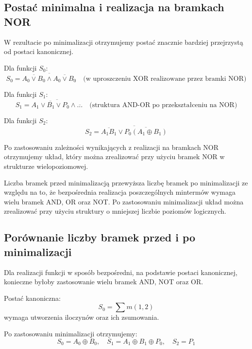 \documentclass[11pt]{article}
\begin{document}
\subsection{Postać minimalna i realizacja na bramkach NOR}

W rezultacie po minimalizacji otrzymujemy postać znacznie bardziej przejrzystą od postaci kanonicznej.

Dla funkcji \(S_0\):
\begin{equation}
S_0 = \overline{\overline{A_0 \lor B_0} \land \overline{A_0 \lor B_0}} \quad \text{(w uproszczeniu XOR realizowane przez bramki NOR)}
\end{equation}

Dla funkcji \(S_1\):
\begin{equation}
S_1 = \overline{\overline{A_1 \lor B_1 \lor P_0} \land \overline{\dots}} \quad \text{(struktura AND-OR po przekształceniu na NOR)}
\end{equation}

Dla funkcji \(S_2\):
\begin{equation}
S_2 = \overline{\overline{A_1 B_1} \lor \overline{P_0 (A_1 \oplus B_1)}}
\end{equation}

Po zastosowaniu zależności wynikających z realizacji na bramkach NOR otrzymujemy układ, który można zrealizować przy użyciu bramek NOR w strukturze wielopoziomowej.

Liczba bramek przed minimalizacją przewyższa liczbę bramek po minimalizacji ze względu na to, że bezpośrednia realizacja poszczególnych mintermów wymaga wielu bramek AND, OR oraz NOT. Po zastosowaniu minimalizacji układ można zrealizować przy użyciu struktury o mniejszej liczbie poziomów logicznych.

\subsection{Porównanie liczby bramek przed i po minimalizacji}

Dla realizacji funkcji w sposób bezpośredni, na podstawie postaci kanonicznej, konieczne byłoby zastosowanie wielu bramek AND, NOT oraz OR.

Postać kanoniczna:
\begin{equation}
S_0 = \sum m(1,2)
\end{equation}
wymaga utworzenia iloczynów oraz ich zsumowania.

Po zastosowaniu minimalizacji otrzymujemy:
\begin{equation}
S_0 = A_0 \oplus B_0,\quad S_1 = A_1 \oplus B_1 \oplus P_0,\quad S_2 = P_1
\end{equation}
\end{document}
